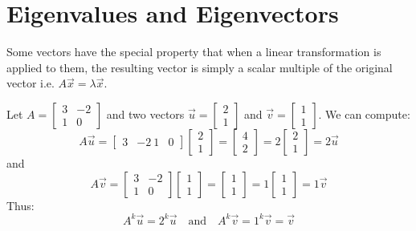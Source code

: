 \chapter{Eigenvalues and Eigenvectors}
Some vectors have the special property that when a linear transformation is applied to them, the resulting vector is simply a scalar multiple of the original vector i.e. $A \vec{x} = \lambda \vec{x}$.
\begin{eg}
    Let $A = \begin{bmatrix}
        3 & -2 \\
        1 & 0
    \end{bmatrix}$ and two vectors $\vec{u} = \begin{bmatrix}
        2 \\ 1
    \end{bmatrix}$ and $\vec{v} = \begin{bmatrix}
        1 \\ 1
    \end{bmatrix}$. We can compute:
    \[A \vec{u} = \begin{bmatrix}
        3 & -2 \
        1 & 0
    \end{bmatrix} \begin{bmatrix}
        2 \\ 1
    \end{bmatrix} = \begin{bmatrix}
        4 \\ 2
    \end{bmatrix} = 2 \begin{bmatrix}
        2 \\ 1
    \end{bmatrix} = 2 \vec{u}\]
    and
    \[A \vec{v} = \begin{bmatrix}
        3 & -2 \\
        1 & 0
    \end{bmatrix} \begin{bmatrix}
        1 \\ 1
    \end{bmatrix} = \begin{bmatrix}
        1 \\ 1
    \end{bmatrix} = 1 \begin{bmatrix}
        1 \\ 1
    \end{bmatrix} = 1 \vec{v}\]
    Thus:
    \[
        A^k \vec{u} = 2^k \vec{u} \quad \text{and} \quad A^k \vec{v} = 1^k \vec{v} = \vec{v}
    \]
\end{eg}

